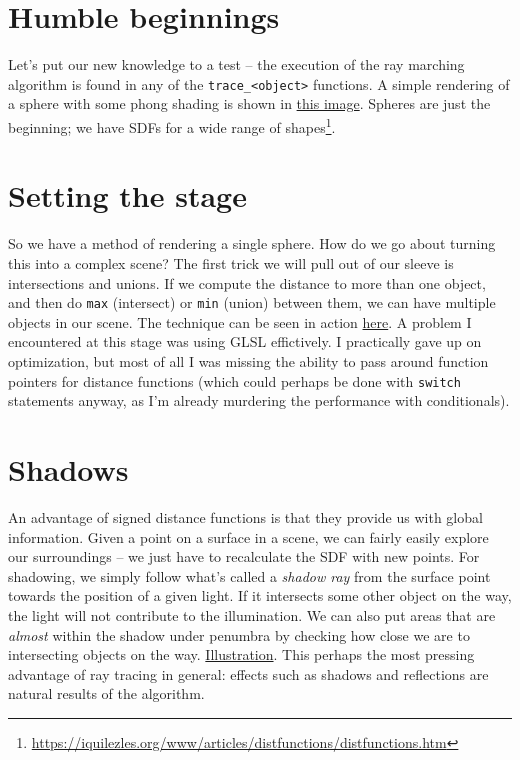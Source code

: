 \documentclass[abstract=off,oneside]{scrreprt}
\begin{document}
\section*{Humble beginnings}
\label{sec-4}
\label{sec:beginnings}
Let's put our new knowledge to a test -- the execution of the ray
marching algorithm is found in any of the \verb~trace_<object>~
functions. A simple rendering of a sphere with some phong shading is
shown in \hyperref[fig:simplesphere]{this image}. Spheres are just the beginning; we have SDFs for
a wide range of shapes\footnote{\url{https://iquilezles.org/www/articles/distfunctions/distfunctions.htm}}.

\section*{Setting the stage}
\label{sec-5}
\label{sec:creatingascene}
So we have a method of rendering a single sphere. How do we go about
turning this into a complex scene? The first trick we will pull out of
our sleeve is intersections and unions. If we compute the distance to
more than one object, and then do \verb~max~ (intersect) or \verb~min~ (union)
between them, we can have multiple objects in our scene. The technique
can be seen in action \hyperref[fig:union]{here}. A problem I encountered at this stage was
using GLSL effictively. I practically gave up on optimization, but
most of all I was missing the ability to pass around function pointers
for distance functions (which could perhaps be done with \verb~switch~
statements anyway, as I'm already murdering the performance with
conditionals).

\section*{Shadows}
\label{sec-6}
\label{sec:shadows} An advantage of signed distance functions is that they
provide us with global information. Given a point on a surface in a
scene, we can fairly easily explore our surroundings -- we just have
to recalculate the SDF with new points. For shadowing, we simply
follow what's called a \emph{shadow ray} from the surface point towards the
position of a given light. If it intersects some other object on the
way, the light will not contribute to the illumination. We can also
put areas that are \emph{almost} within the shadow under penumbra by
checking how close we are to intersecting objects on the
way. \hyperref[fig:penumbra]{Illustration}. This perhaps the most pressing advantage of ray
tracing in general: effects such as shadows and reflections are
natural results of the algorithm.
\end{document}
